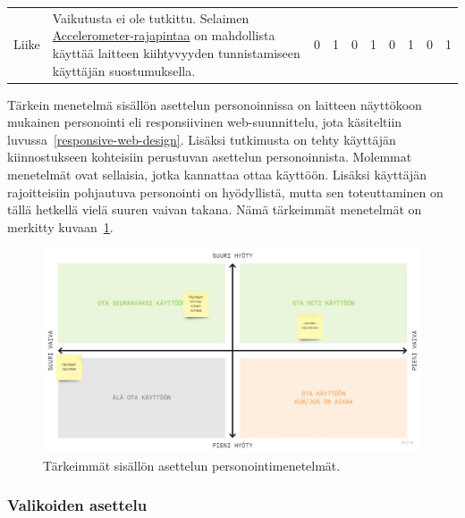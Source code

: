 \documentclass[finnish, 12pt, a4paper, elec, utf8, a-1b, online]{aaltothesis}
\begin{document}
{\begin{longtable}{p{2.5cm}|p{6cm}|p{0.5cm}p{0.5cm}p{0.5cm}|p{0.5cm}|p{0.5cm}p{0.5cm}p{0.5cm}|p{0.5cm}|}
    \midrule
    Liike                                  & Vaikutusta ei ole tutkittu. Selaimen \href{https://developer.mozilla.org/en-US/docs/Web/API/Accelerometer}{Accelerometer-rajapintaa} on mahdollista käyttää laitteen kiihtyvyyden tunnistamiseen käyttäjän suostumuksella.                                                                                                              & 0                                          & 1                                   & 0                                      & 1                            & 0                                               & 1                                         & 0                                         & 1                            \\
\end{longtable}
}

Tärkein menetelmä sisällön asettelun personoinnissa on laitteen näyttökoon
mukainen personointi eli responsiivinen web-suunnittelu, jota käsiteltiin
luvussa~\ref{responsive-web-design}. Lisäksi tutkimusta on tehty käyttäjän
kiinnostukseen kohteisiin perustuvan asettelun personoinnista. Molemmat
menetelmät ovat sellaisia, jotka kannattaa ottaa käyttöön. Lisäksi käyttäjän
rajoitteisiin pohjautuva personointi on hyödyllistä, mutta sen toteuttaminen on
tällä hetkellä vielä suuren vaivan takana. Nämä tärkeimmät menetelmät on
merkitty kuvaan~\ref{fig:layout-priorization}.

\begin{figure}[htb]
    \centering
    \includegraphics[width=\textwidth]{images/layout-priorization.pdf}
    \caption{Tärkeimmät sisällön asettelun personointimenetelmät.~\label{fig:layout-priorization}}
\end{figure}

\subsubsection{Valikoiden asettelu}
\end{document}
